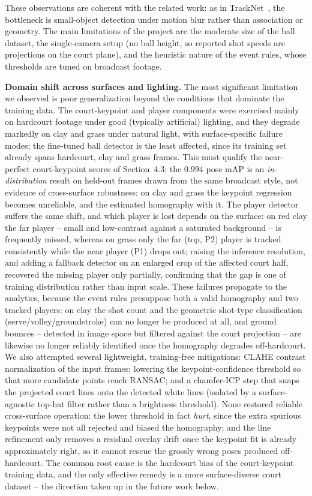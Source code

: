 \documentclass[10pt,twocolumn,a4paper]{article}
\begin{document}
	These observations are coherent with the related work: as in TrackNet~\cite{huang2019tracknet}, the bottleneck is small-object detection under motion blur rather than association or geometry. The main limitations of the project are the moderate size of the ball dataset, the single-camera setup (no ball height, so reported shot speeds are projections on the court plane), and the heuristic nature of the event rules, whose thresholds are tuned on broadcast footage.

	\textbf{Domain shift across surfaces and lighting.} The most significant limitation we observed is poor generalization beyond the conditions that dominate the training data. The court-keypoint and player components were exercised mainly on hardcourt footage under good (typically artificial) lighting, and they degrade markedly on clay and grass under natural light, with surface-specific failure modes; the fine-tuned ball detector is the least affected, since its training set already spans hardcourt, clay and grass frames. This must qualify the near-perfect court-keypoint scores of Section~4.3: the $0.994$ pose mAP is an \emph{in-distribution} result on held-out frames drawn from the same broadcast style, not evidence of cross-surface robustness; on clay and grass the keypoint regression becomes unreliable, and the estimated homography with it. The player detector suffers the same shift, and which player is lost depends on the surface: on red clay the far player -- small and low-contrast against a saturated background -- is frequently missed, whereas on grass only the far (top, P2) player is tracked consistently while the near player (P1) drops out; raising the inference resolution, and adding a fallback detector on an enlarged crop of the affected court half, recovered the missing player only partially, confirming that the gap is one of training distribution rather than input scale. These failures propagate to the analytics, because the event rules presuppose both a valid homography and two tracked players: on clay the shot count and the geometric shot-type classification (serve/volley/groundstroke) can no longer be produced at all, and ground bounces -- detected in image space but filtered against the court projection -- are likewise no longer reliably identified once the homography degrades off-hardcourt. We also attempted several lightweight, training-free mitigations: CLAHE contrast normalization of the input frames; lowering the keypoint-confidence threshold so that more candidate points reach RANSAC; and a chamfer-ICP step that snaps the projected court lines onto the detected white lines (isolated by a surface-agnostic top-hat filter rather than a brightness threshold). None restored reliable cross-surface operation: the lower threshold in fact \emph{hurt}, since the extra spurious keypoints were not all rejected and biased the homography; and the line refinement only removes a residual overlay drift once the keypoint fit is already approximately right, so it cannot rescue the grossly wrong poses produced off-hardcourt. The common root cause is the hardcourt bias of the court-keypoint training data, and the only effective remedy is a more surface-diverse court dataset -- the direction taken up in the future work below.
\end{document}
